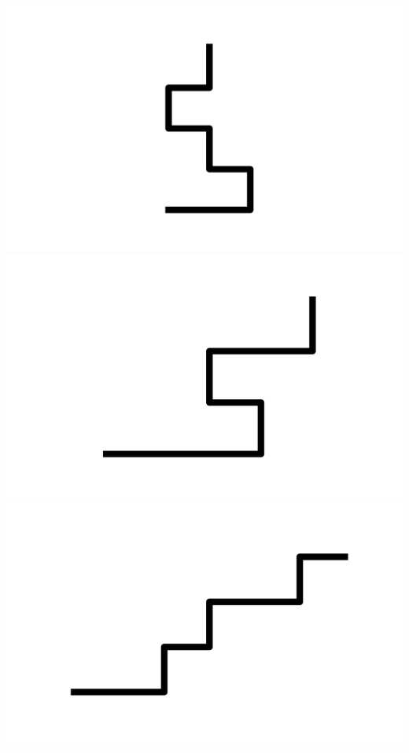\documentclass[]{report}
\begin{document}
\includegraphics[scale=.1]{pictures/21/state_cluster_shapes_241.pdf} 
\includegraphics[scale=.1]{pictures/21/state_cluster_shapes_242.pdf} 
\includegraphics[scale=.1]{pictures/21/state_cluster_shapes_243.pdf} 
\end{document}
